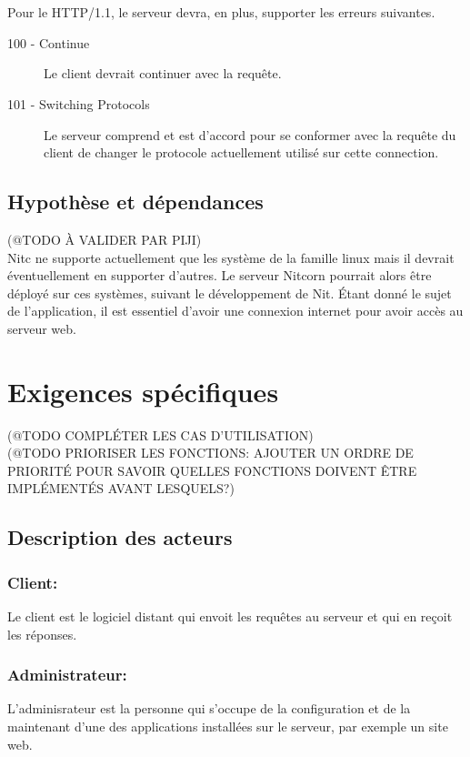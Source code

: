 \documentclass{scrreprt}
\begin{document}
 \\\\
 Pour le HTTP/1.1, le serveur devra, en plus, supporter les erreurs suivantes.\\
 \begin{description}
 \item [100 - Continue] Le client devrait continuer avec la requête.
 \item [101 - Switching Protocols] Le serveur comprend et est d'accord pour se conformer avec la requête du client de changer le protocole actuellement utilisé sur cette connection.
 \end{description}
    
\section{Hypothèse et dépendances}
(@TODO À VALIDER PAR PIJI)\\
Nitc ne supporte actuellement que les système de la famille linux mais il devrait éventuellement en supporter d'autres. Le serveur Nitcorn pourrait alors être déployé sur ces systèmes, suivant le développement de Nit.
Étant donné le sujet de l'application, il est essentiel d'avoir une connexion internet pour avoir accès au serveur web.\\


\chapter{Exigences spécifiques}
(@TODO COMPLÉTER LES CAS D'UTILISATION)\\
(@TODO PRIORISER LES FONCTIONS: AJOUTER UN ORDRE DE PRIORITÉ POUR SAVOIR QUELLES FONCTIONS DOIVENT ÊTRE IMPLÉMENTÉS AVANT LESQUELS?)

\section{Description des acteurs}
\subsection{Client:} Le client est le logiciel distant qui envoit les requêtes au serveur et qui en reçoit les réponses. 
\subsection{Administrateur:} L'adminisrateur est la personne qui s'occupe de la configuration et de la maintenant d'une des applications installées sur le serveur, par exemple un site web.
\end{document}
